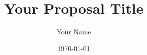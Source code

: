 \documentclass[a4paper,11pt]{article}
\begin{document}
\title{Your Proposal Title}
\author{Your Name}
\date{\today}

\maketitle
\tableofcontents
\listoffigures
\listoftables







\printbibliography
\end{document}
